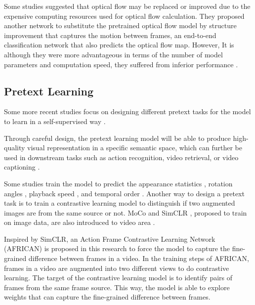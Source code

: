 Some studies suggested that optical flow may be replaced or improved due to the expensive computing resources used for optical flow calculation. They proposed another network to substitute the pretrained optical flow model by structure improvement that captures the motion between frames, an end-to-end classification network that also predicts the optical flow map. However, It is although they were more advantageous in terms of the number of model parameters and computation speed, they suffered from inferior performance \parencite{Lee_2018_ECCV, 8354283, Piergiovanni_2019_CVPR}.

\subsection{Pretext Learning}
Some more recent studies focus on designing different pretext tasks for the model to learn in a self-supervised way \parencite{wang2022internvideo}.

Through careful design, the pretext learning model will be able to produce high-quality visual representation in a specific semantic space, which can further be used in downstream tasks such as action recognition, video retrieval, or video captioning \parencite{10.1145/3577925}.

Some studies train the model to predict the appearance statistics \parencite{Wang_2019_CVPR}, rotation angles \parencite{DBLP:journals/corr/abs-1811-11387}, playback speed \parencite{Yao_2020_CVPR, 10.1007/978-3-030-58520-4_30}, and temporal order \parencite{10.1007/978-3-030-58604-1_26}. Another way to design a pretext task is to train a contrastive learning model to distinguish if two augmented images are from the same source or not. MoCo \parencite{finn2017model} and SimCLR \parencite{pmlr-v119-chen20j}, proposed to train on image data, are also introduced to video area \parencite{Feichtenhofer_2021_CVPR}.

Inspired by SimCLR, an Action Frame Contrastive Learning Network (AFRICAN) is proposed in this research to force the model to capture the fine-grained difference between frames in a video. In the training steps of AFRICAN, frames in a video are augmented into two different views to do contrastive learning. The target of the contrastive learning model is to identify pairs of frames from the same frame source. This way, the model is able to explore weights that can capture the fine-grained difference between frames. 

